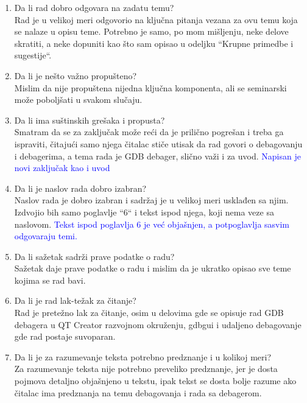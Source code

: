 \documentclass[a4paper]{report}
\newcommand{\odgovor}[1]{\textcolor{blue}{#1}}
\begin{document}
\begin{enumerate}
\item Da li rad dobro odgovara na zadatu temu?\\
Rad je u velikoj meri odgovorio na ključna pitanja vezana za ovu temu koja se nalaze u opisu teme. Potrebno je samo, po mom mišljenju, neke delove skratiti, a neke dopuniti kao što sam opisao u odeljku ``Krupne primedbe i sugestije``.

\item Da li je nešto važno propušteno?\\
Mislim da nije propuštena nijedna ključna komponenta, ali se seminarski može poboljšati u svakom slučaju.

\item Da li ima suštinskih grešaka i propusta?\\
Smatram da se za zaključak može reći da je prilično pogrešan i treba ga ispraviti, čitajući samo njega čitalac stiče utisak da rad govori o debagovanju i debagerima,
a tema rada je GDB debager, slično važi i za uvod.
\odgovor{Napisan je novi zaključak kao i uvod}

\item Da li je naslov rada dobro izabran?\\
Naslov rada je dobro izabran i sadržaj je u velikoj meri usklađen sa njim. Izdvojio bih samo poglavlje ``6`` i tekst ispod njega, koji nema veze sa naslovom.
\odgovor{Tekst ispod poglavlja 6 je već objašnjen, a potpoglavlja sasvim odgovaraju temi.}

\item Da li sažetak sadrži prave podatke o radu?\\
Sažetak daje prave podatke o radu i mislim da je ukratko opisao sve teme kojima se rad bavi.

\item Da li je rad lak-težak za čitanje?\\
Rad je pretežno lak za čitanje, osim u delovima gde se opisuje rad GDB debagera u QT Creator razvojnom okruženju, gdbgui i udaljeno debagovanje gde rad postaje suvoparan.

\item Da li je za razumevanje teksta potrebno predznanje i u kolikoj meri?\\
Za razumevanje teksta nije potrebno preveliko predznanje, jer je dosta pojmova detaljno objašnjeno u tekstu, ipak tekst se dosta bolje razume ako čitalac ima predznanja na temu debagovanja i rada sa debagerom. 


\end{enumerate}
\end{document}
